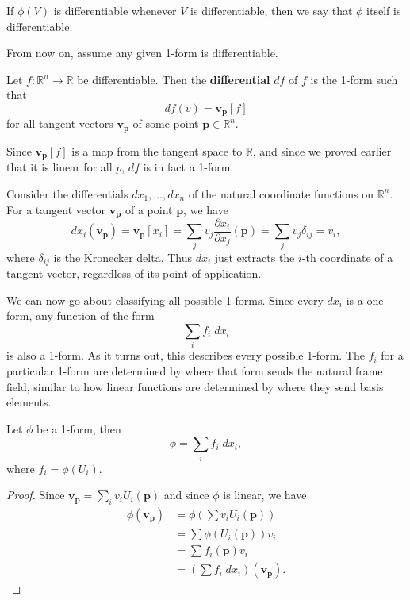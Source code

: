 \documentclass[10pt]{report}
\begin{document}
If $\phi(V)$ is differentiable whenever $V$ is differentiable, then we say that $\phi$ itself is differentiable.

\begin{note}
From now on, assume any given 1-form is differentiable.
\end{note}

\begin{defn}
Let $f:\mathbb{R}^n\to \mathbb{R}$ be differentiable. Then the \textbf{differential} $df$ of $f$ is the 1-form such that
\[
	df(v) = \mathbf{v}_{\mathbf{p}}[f]
\] for all tangent vectors $\mathbf{v}_{\mathbf{p}}$ of some point $\mathbf{p} \in \mathbb{R}^n$.
\end{defn}

Since $\mathbf{v}_{\mathbf{p}}[f]$ is a map from the tangent space to $\mathbb{R}$, and since we proved earlier that it is linear for all $p$, $df$ is in fact a 1-form.

\begin{ex}
Consider the differentials $dx_1, \dots, dx_n$ of the natural coordinate functions on $\mathbb{R}^n$. For a tangent vector $\mathbf{v}_{\mathbf{p}}$ of a point $\mathbf{p}$, we have
\[
	dx_i(\mathbf{v}_{\mathbf{p}}) = \mathbf{v}_{\mathbf{p}}[x_i] = \sum_j v_j \frac{\partial x_i}{\partial x_j} (\mathbf{p}) = \sum_j v_j \delta_{ij} = v_i,
\] where $\delta_{ij}$ is the Kronecker delta. Thus $dx_i$ just extracts the $i$-th coordinate of a tangent vector, regardless of its point of application.
\end{ex}

We can now go about classifying all possible 1-forms. Since every $dx_i$ is a one-form, any function of the form
\[
\sum_i f_i \;dx_i
\] is also a 1-form. As it turns out, this describes every possible 1-form. The $f_i$ for a particular 1-form are determined by where that form sends the natural frame field, similar to how linear functions are determined by where they send basis elements.

\begin{prop}
Let $\phi$ be a 1-form, then
\[
	\phi = \sum_i f_i \;dx_i,
\] where $f_i = \phi(U_i)$.
\end{prop}
\begin{proof}
	Since $\mathbf{v}_{\mathbf{p}} = \sum_i v_i U_i(\mathbf{p})$ and since $\phi$ is linear, we have
	\begin{align*}
		\phi(\mathbf{v}_{\mathbf{p}}) &= \phi\left( \sum v_i U_i(\mathbf{p}) \right) \\
					      &= \sum \phi(U_i(\mathbf{p}))v_i \\
					      &= \sum f_i(\mathbf{p}) v_i \\
					      &= \left( \sum f_i \;dx_i \right)(\mathbf{v}_{\mathbf{p}}).
	\end{align*}
\end{proof}
\end{document}
